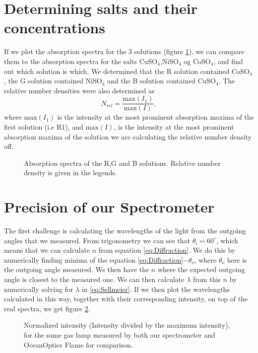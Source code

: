 \section{Determining salts and their concentrations}
If we plot the absorption spectra for the 3 solutions (figure \ref{fig:AbsorptionSpectra}), we can compare them to the absorption spectra for the salts
$\text{CuSO}_4$,$\text{NiSO}_4$ og $\text{CoSO}_4$, and find out which solution is which.
We determined that the R solution contained $\text{CoSO}_4$, the G solution contained $\text{NiSO}_4$ and the B solution contained $\text{CuSO}_4$.
The relative number densities were also determined as 
\[N_{rel} = \frac{\text{max}(I_1)}{\text{max}(I)},\]
where $\text{max}(I_1)$ is the intensity at the most prominent absorption maxima of the first solution (i.e R1), and $\text{max}(I)$, is the intensity at the most prominent absorption maxima of the solution we are calculating the relative number density off.
\begin{figure}
    \centering
    
    \caption{Absorption spectra of the R,G and B solutions. Relative number density is given in the legends.}
    \label{fig:AbsorptionSpectra}
\end{figure}
\section{Precision of our Spectrometer}
The first challenge is calculating the wavelengths of the light from the outgoing angles that we measured.
From trigonometry we can see that $\theta_i = 60^\circ$, which means that we can calculate $n$ from equation \eqref{eq:Diffraction}.
We do this by numerically finding minima of the equation \eqref{eq:Diffraction}$ - \theta_o$, where $\theta_o$ here is the outgoing angle measured.
We then have the $n$ where the expected outgoing angle is closest to the measured one.
We can then calculate $\lambda$ from this $n$ by numerically solving for $\lambda$ in \eqref{eq:Sellmeier}.
If we then plot the wavelengths calculated in this way, together with their corresponding intensity, on top of the real spectra, we get figure \ref{fig:SpectrometerComparison}.
\begin{figure}
    \centering
    
    \caption{Normalized intensity (Intensity divided by the maximum intensity), for the same gas lamp measured by both our spectrometer and OceanOptics Flame for comparison.}
    \label{fig:SpectrometerComparison}
\end{figure}